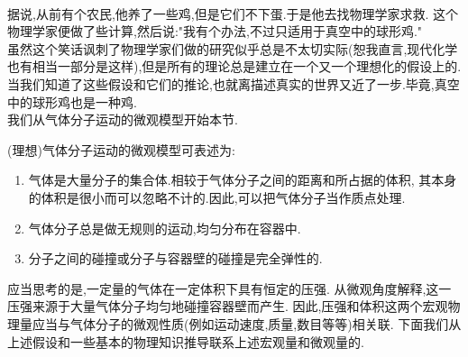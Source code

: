 \documentclass{ctexart}
\begin{document}
\pagestyle{plain}
\noindent{}\vspace{15pt}\\
%
\indent 据说,从前有个农民,他养了一些鸡,但是它们不下蛋.于是他去找物理学家求救.%
这个物理学家便做了些计算,然后说:"我有个办法,不过只适用于真空中的球形鸡."\\
\indent 虽然这个笑话讽刺了物理学家们做的研究似乎总是不太切实际(恕我直言,现代化学也有相当一部分是这样),但是所有的理论总是建立在一个又一个理想化的假设上的.%
当我们知道了这些假设和它们的推论,也就离描述真实的世界又近了一步.毕竟,真空中的球形鸡也是一种鸡.\vspace{12pt}\\
\indent 我们从气体分子运动的微观模型开始本节.
\begin{theorem}[1B.1.1 气体分子运动的微观模型]
    (理想)气体分子运动的微观模型可表述为:
    \begin{enumerate}[label=\tbf{\arabic*.}]
        \item 气体是大量分子的集合体.相较于气体分子之间的距离和所占据的体积,%
            其本身的体积是很小而可以忽略不计的.因此,可以把气体分子当作质点处理.
        \item 气体分子总是做无规则的运动,均匀分布在容器中.
        \item 分子之间的碰撞或分子与容器壁的碰撞是完全弹性的.
    \end{enumerate}
\end{theorem}
应当思考的是,一定量的气体在一定体积下具有恒定的压强.%
从微观角度解释,这一压强来源于大量气体分子均匀地碰撞容器壁而产生.%
因此,压强和体积这两个宏观物理量应当与气体分子的微观性质(例如运动速度,质量,数目等等)相关联.%
下面我们从上述假设和一些基本的物理知识推导联系上述宏观量和微观量的.
\end{document}
